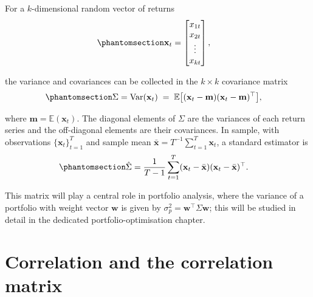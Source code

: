 \documentclass[
  letterpaper,
  DIV=11,
  numbers=noendperiod]{scrreprt}
\begin{document}

For a \(k\)-dimensional random vector of returns
\begin{equation}\protect\phantomsection\label{eq-gen-0077}{ 
\begin{align}
    \mathbf{x}_t
    &=
    \begin{bmatrix}
        x_{1t} \\ x_{2t} \\ \vdots \\ x_{kt}
    \end{bmatrix},
\end{align}
}\end{equation}

the variance and covariances can be collected in the \(k\times k\)
covariance matrix
\begin{equation}\protect\phantomsection\label{eq-gen-0078}{  
\begin{align}
    \Sigma
    &= \mathrm{Var}(\mathbf{x}_t)
     \;=\; \mathbb{E}\big[(\mathbf{x}_t - \mathbf{m})
                         (\mathbf{x}_t - \mathbf{m})^{\top}\big],
\end{align}
}\end{equation}

where \(\mathbf{m} = \mathbb{E}(\mathbf{x}_t)\). The diagonal elements
of \(\Sigma\) are the variances of each return series and the
off-diagonal elements are their covariances. In sample, with
observations \(\{\mathbf{x}_t\}_{t=1}^T\) and sample mean
\(\bar{\mathbf{x}} = T^{-1}\sum_{t=1}^T \mathbf{x}_t\), a standard
estimator is
\begin{equation}\protect\phantomsection\label{eq-gen-0079}{  
\begin{align}
    \hat{\Sigma}
    &= \frac{1}{T-1} \sum_{t=1}^T
        (\mathbf{x}_t - \bar{\mathbf{x}})
        (\mathbf{x}_t - \bar{\mathbf{x}})^{\top}.
\end{align}
}\end{equation}

This matrix will play a central role in portfolio analysis, where the
variance of a portfolio with weight vector \(\mathbf{w}\) is given by
\(\sigma_p^2 = \mathbf{w}^{\top} \Sigma \mathbf{w}\); this will be
studied in detail in the dedicated portfolio-optimisation chapter.

\section*{Correlation and the correlation
matrix}\label{correlation-and-the-correlation-matrix}
\end{document}
